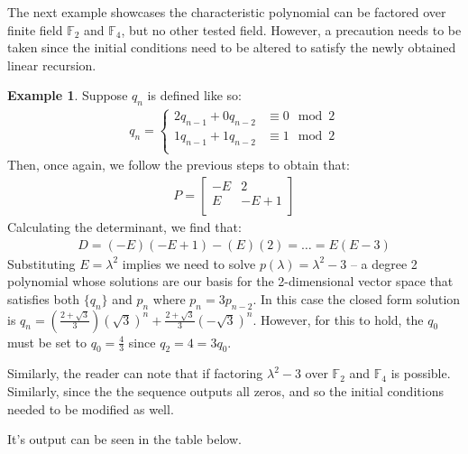 \documentclass[a4paper]{article}
\theoremstyle{definition}
\newtheorem{example}{Example}[section]
\begin{document}
The next example showcases the characteristic polynomial can be factored over finite field $\mathbb{F}_2$ and $\mathbb{F}_4$, but no other tested field. However, a precaution needs to be taken since the initial conditions need to be altered to satisfy the newly obtained linear recursion. 
\\
\begin{example}
Suppose $q_n$ is defined like so:
\begin{align*}
q_n=
\begin{cases}
2q_{n-1}+0q_{n-2} & \equiv 0 \mod 2 \\
1q_{n-1}+1q_{n-2} & \equiv 1 \mod 2 \\
\end{cases}
\end{align*}
Then, once again, we follow the previous steps to obtain that:
\begin{align*}
P=
\begin{bmatrix}
   -E &    2 \\
    E & -E+1 \\
\end{bmatrix}
\end{align*}
Calculating the determinant, we find that:
\begin{align*}
D=(-E)(-E+1)-(E)(2)=\ldots=E(E-3)
\end{align*}
Substituting $E=\lambda^2$ implies we need to solve $p(\lambda)=\lambda^2-3$ -- a degree 2 polynomial whose solutions are our basis for the 2-dimensional vector space that satisfies both $\{q_n\}$ and ${p_n}$ where $p_n=3p_{n-2}$. In this case the closed form solution is $q_n=\left(\frac{2+\sqrt{3}}{3}\right)(\sqrt{3})^n+\frac{2+\sqrt{3}}{3}(-\sqrt{3})^n$. However, for this to hold, the $q_0$ must be set to $q_0=\frac{4}{3}$ since $q_2={4}=3q_0$. 

Similarly, the reader can note that if factoring $\lambda^2-3$ over $\mathbb{F}_2$ and $\mathbb{F}_4$ is possible. Similarly, since the the sequence outputs all zeros, and so the initial conditions needed to be modified as well. 

It's output can be seen in the table below.


\end{example}
\end{document}
